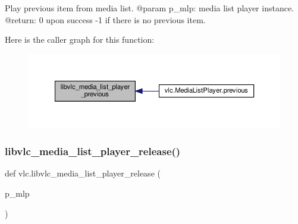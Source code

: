 \begin{DoxyVerb}Play previous item from media list.
@param p_mlp: media list player instance.
@return: 0 upon success -1 if there is no previous item.
\end{DoxyVerb}
 Here is the caller graph for this function\+:
\nopagebreak
\begin{figure}[H]
\begin{center}
\leavevmode
\includegraphics[width=350pt]{namespacevlc_a528f3b4e34c0d8591691fb2f4aaf2aff_icgraph}
\end{center}
\end{figure}
\mbox{\label{namespacevlc_a3763e35fa1176f0fafd4fe033738e96f}} 
\subsubsection{\texorpdfstring{libvlc\+\_\+media\+\_\+list\+\_\+player\+\_\+release()}{libvlc\_media\_list\_player\_release()}}
{\footnotesize\ttfamily def vlc.\+libvlc\+\_\+media\+\_\+list\+\_\+player\+\_\+release (\begin{DoxyParamCaption}\item[{}]{p\+\_\+mlp }\end{DoxyParamCaption})}

